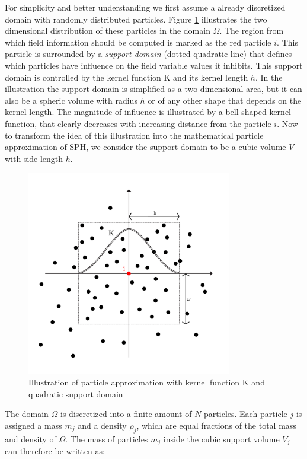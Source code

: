 For simplicity and better understanding we first assume a already discretized domain with randomly distributed particles. Figure \ref{fig:sph_par_approx_domain} illustrates the two dimensional distribution of these particles in the domain $\Omega$. The region from which field information should be computed is marked as the red particle $i$. This particle is surrounded by a \emph{support domain} (dotted quadratic line) that defines which particles have influence on the field variable values it inhibits. This support domain is controlled by the kernel function K and its kernel length $h$. In the illustration the support domain is simplified as a two dimensional area, but it can also be a spheric volume with radius $h$ or of any other shape that depends on the kernel length. The magnitude of influence is illustrated by
a bell shaped kernel function, that clearly decreases with increasing distance from the particle $i$. Now to transform the idea of this illustration into the mathematical particle approximation of SPH, we consider the support domain to be a cubic volume $V$  with side length $h$.


\begin{figure}[htb]
\centering
\includegraphics[width=0.8\textwidth]{../figures/sph_particle_domain.pdf}
\caption{Illustration of particle approximation with kernel function K and quadratic support domain}
\label{fig:sph_par_approx_domain}
\end{figure}

The domain $\Omega$ is discretized into a finite amount of $N$ particles. Each particle $j$ is assigned a mass $m_{j}$ and a density $\rho_{j}$, which are equal fractions of the total mass and density of $\Omega$. The mass of particles $m_{j}$ inside the cubic support volume $V_{j}$ can therefore be written as:

